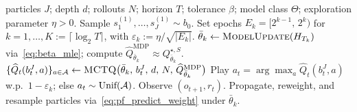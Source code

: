 

\begin{algorithm}[t]
\caption[Online particle filtering with finite-depth Monte Carlo belief-tree planning]{  (Algorithm~\ref{alg:mctq}) takes the particle belief $b_t^J$ and returns an estimate $\widehat Q_t(b_t^J,a)$ of $Q_{\bar\theta_k,d}(b_t^J,a)$ for every root action $a\in\gA$.}
\label{alg:pf_mcts}
\begin{algorithmic}[1]
\Require particles $J$; depth $d$; rollouts $N$; horizon $T$; tolerance $\beta$; model class $\Theta$; exploration parameter $\eta>0$.
\State Sample $s^{(1)}_1,\ldots,s^{(1)}_J \sim b_0$.
\State Set epochs $E_k=[2^{k-1},\,2^k)$ for $k=1,\ldots,K:=\lceil\log_2 T\rceil$, with $\varepsilon_k:=\eta/\sqrt{|E_k|}$.
  \State $\bar\theta_k \gets \textsc{ModelUpdate}(H_{T_k})$ via~\eqref{eq:beta_mle}; compute $\widehat Q^{\mathrm{MDP}}_{\bar\theta_k}\approx Q_{\bar\theta_k}^{\star,S}$.
    \State $\{\widehat Q_t(b_t^J,a)\}_{a\in{\mathcal{A}}}\gets \textsc{MCTQ}\bigl(\bar\theta_k,\,b_t^J,\,d,\,N,\,\widehat Q^{\mathrm{MDP}}_{\bar\theta_k}\bigr)$ 
    \State Play $a_t = \arg\max_a \widehat Q_t(b_t^J,a)$ w.p.\ $1-\varepsilon_k$; else $a_t \sim \text{Unif}({\mathcal{A}})$.
    \State Observe $(o_{t+1},r_t)$.
    \State Propagate, reweight, and resample particles via~\eqref{eq:pf_predict_weight} under $\bar\theta_k$.
  \EndFor
\EndFor
\end{algorithmic}
\end{algorithm}




